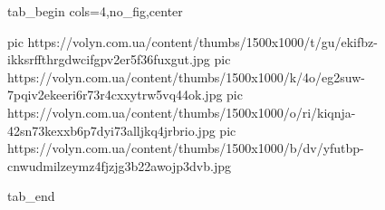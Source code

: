  
 
 
 
 


\ifcmt
  tab_begin cols=4,no_fig,center

     pic https://volyn.com.ua/content/thumbs/1500x1000/t/gu/ekifbz-ikksrffthrgdwcifgpv2er5f36fuxgut.jpg
		 pic https://volyn.com.ua/content/thumbs/1500x1000/k/4o/eg2suw-7pqiv2ekeeri6r73r4cxxytrw5vq44ok.jpg
		 pic https://volyn.com.ua/content/thumbs/1500x1000/o/ri/kiqnja-42sn73kexxb6p7dyi73alljkq4jrbrio.jpg
		 pic https://volyn.com.ua/content/thumbs/1500x1000/b/dv/yfutbp-cnwudmilzeymz4fjzjg3b22awojp3dvb.jpg

  tab_end
\fi
